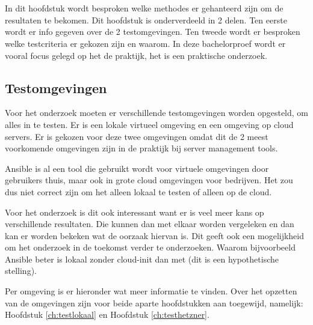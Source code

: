 
\chapter{}
\label{ch:methodologie}

In dit hoofdstuk wordt besproken welke methodes er gehanteerd zijn om de resultaten te bekomen. Dit hoofdstuk is onderverdeeld in 2 delen. Ten eerste wordt er info gegeven over de 2 testomgevingen. Ten tweede wordt er besproken welke testcriteria er gekozen zijn en waarom. In deze bachelorproef wordt er vooral focus gelegd op het de praktijk, het is een praktische onderzoek.

\section{Testomgevingen}
Voor het onderzoek moeten er verschillende testomgevingen worden opgesteld, om alles in te testen. Er is een lokale virtueel  omgeving en een omgeving op cloud servers. Er is gekozen voor deze twee omgevingen omdat dit de 2 meest voorkomende omgevingen zijn in de praktijk bij server management tools. 

Ansible is al een tool die gebruikt wordt voor virtuele omgevingen door gebruikers thuis, maar ook in grote cloud omgevingen voor bedrijven. Het zou dus niet correct zijn om het alleen lokaal te testen of alleen op de cloud. 

Voor het onderzoek is dit ook interessant want er is veel meer kans op verschillende resultaten. Die kunnen dan met elkaar worden vergeleken en dan kan er worden bekeken wat de oorzaak hiervan is. Dit geeft ook een mogelijkheid om het onderzoek in de toekomst verder te onderzoeken. Waarom bijvoorbeeld Ansible beter is lokaal zonder cloud-init dan met (dit is een hypothetische stelling).

\newpage
Per omgeving is er hieronder wat meer informatie te vinden. Over het opzetten van de omgevingen zijn voor beide aparte hoofdstukken aan toegewijd, namelijk: Hoofdstuk \ref*{ch:testlokaal} en Hoofdstuk \ref*{ch:testhetzner}.

